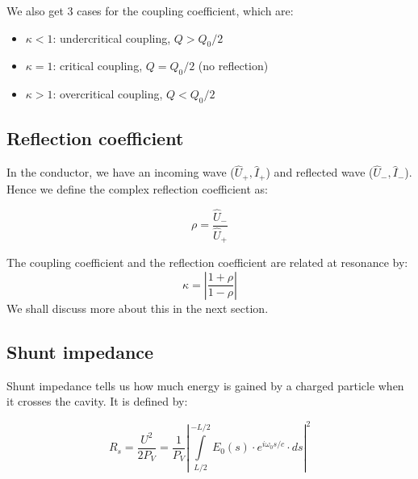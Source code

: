 \documentclass[a4paper]{article}
\numberwithin{equation}{section}
\begin{document}
We also get 3 cases for the coupling coefficient, which are: 

\begin{itemize}
		\item $\kappa < 1$: undercritical coupling, $Q>Q_{0}/2$
		\item $\kappa = 1$: critical coupling, $Q = Q_{0}/2$ (no reflection)
		\item $\kappa > 1$: overcritical coupling, $Q<Q_{0}/2$ 
\end{itemize}

\subsection{Reflection coefficient}
In the conductor, we have an incoming wave ($\hat{U}_{+}, \hat{I}_{+}$) and reflected wave ($\hat{U}_{-}, \hat{I}_{-}$). Hence we define the complex reflection coefficient as:

\begin{equation}
		\rho = \frac{\hat{U}_{-}}{\hat{U}_{+}}
\end{equation}

The coupling coefficient and the reflection coefficient are related at resonance by: 
\begin{equation}
		\kappa = \left|\frac{1 + \rho}{1 - \rho} \right| 
\end{equation}
We shall discuss more about this in the next section.

\subsection{Shunt impedance}
Shunt impedance tells us how much energy is gained by a charged particle when it crosses the cavity. It is defined by: 

\begin{equation}
		R_{s} = \frac{U^2}{2 P_{V}} = \frac{1}{P_{V}} \left|\int\limits_{L/2}^{-L/2} E_{0}\left(s \right) \cdot e^{i \omega_{0}s/c}\cdot ds \right|^2 
\end{equation}
\end{document}
